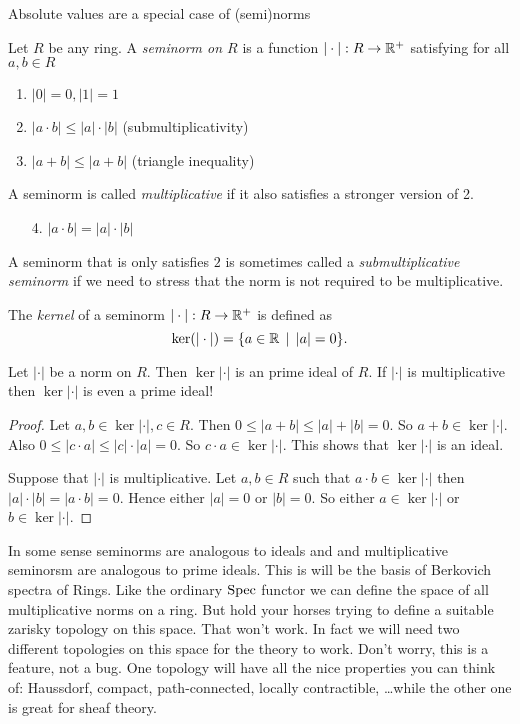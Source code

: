 Absolute values are a special case of (semi)norms
\begin{definition}
	Let $R$ be any ring. A \emph{seminorm on $R$} is a function $|\cdot |: R \to \mathbb{R}^{+}$ satisfying for all $a, b \in R$ 
	\begin{enumerate}
		\item $|0| = 0, |1| = 1$ 
		\item $|a \cdot b| \le |a | \cdot |b|$  (submultiplicativity)
		\item $|a + b| \le |a + b|$ (triangle inequality)
	\end{enumerate}
	A seminorm is called \emph{multiplicative} if it also satisfies a stronger version of 2. 
	\begin{enumerate}
		\item [4.]  $|a \cdot  b| = |a | \cdot |b|$
	\end{enumerate}
	A seminorm that is only satisfies $2$ is sometimes called a \emph{submultiplicative seminorm} if we need to stress that the norm is not required to be multiplicative. 
\end{definition}

\begin{definition}
	The \emph{kernel} of a seminorm $|\cdot |: R \to \mathbb{R}^{+}$ is defined as \[
		\ker(|\cdot |) = \{a \in \R \st |a| = 0\} 
	.\] 
\end{definition}
\begin{remark}\label{rem:ker_norm_ideal}
	Let $ |\cdot |$ be a norm on $R$. Then $\ker |\cdot |$ is an prime ideal of $R$. If $|\cdot |$ is multiplicative then $\ker |\cdot |$ is even a prime ideal!
\end{remark}
\begin{proof}
	Let $a, b \in \ker |\cdot |, c \in R$. Then $0 \le |a + b| \le |a|+|b| = 0$. So  $a + b \in \ker |\cdot |$. 
	Also $0 \le |c \cdot a| \le |c|\cdot |a| = 0$. So $c \cdot a \in \ker |\cdot |$. 
	This shows that $\ker |\cdot  |$ is an ideal. 
	
	Suppose that $|\cdot |$ is multiplicative. 
	Let $a, b\in R $ such that $a\cdot b \in \ker |\cdot |$ then  $|a|\cdot |b| = |a\cdot b| = 0$. 
	Hence either $|a| = 0$ or  $|b|=0$. 
	So either  $a \in \ker |\cdot |$ or $b \in \ker |\cdot |$. 
\end{proof}

In some sense seminorms are analogous to ideals and and multiplicative seminorsm are analogous to prime ideals. This is will be the basis of Berkovich spectra of Rings.
Like the ordinary $\operatorname{Spec}$ functor we can define the space of all multiplicative norms on a ring. 
But hold your horses trying to define a suitable zarisky topology on this space. 
That won't work. 
In fact we will need two different topologies on this space for the theory to work. 
Don't worry, this is a feature, not a bug. 
One topology will have all the nice properties you can think of: Haussdorf, compact, path-connected, locally contractible, \ldots while the other one is great for sheaf theory. 


